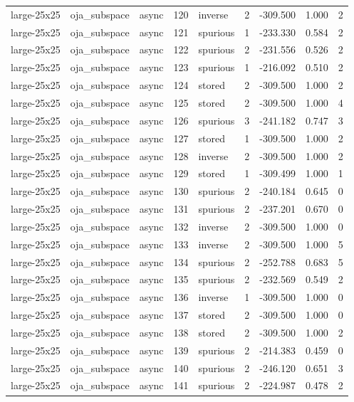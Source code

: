 \begin{tabular}{lllrlrrrr}
large-25x25 & oja\_subspace & async & 120 & inverse & 2 & -309.500 & 1.000 & 2 \\
large-25x25 & oja\_subspace & async & 121 & spurious & 1 & -233.330 & 0.584 & 2 \\
large-25x25 & oja\_subspace & async & 122 & spurious & 2 & -231.556 & 0.526 & 2 \\
large-25x25 & oja\_subspace & async & 123 & spurious & 1 & -216.092 & 0.510 & 2 \\
large-25x25 & oja\_subspace & async & 124 & stored & 2 & -309.500 & 1.000 & 2 \\
large-25x25 & oja\_subspace & async & 125 & stored & 2 & -309.500 & 1.000 & 4 \\
large-25x25 & oja\_subspace & async & 126 & spurious & 3 & -241.182 & 0.747 & 3 \\
large-25x25 & oja\_subspace & async & 127 & stored & 1 & -309.500 & 1.000 & 2 \\
large-25x25 & oja\_subspace & async & 128 & inverse & 2 & -309.500 & 1.000 & 2 \\
large-25x25 & oja\_subspace & async & 129 & stored & 1 & -309.499 & 1.000 & 1 \\
large-25x25 & oja\_subspace & async & 130 & spurious & 2 & -240.184 & 0.645 & 0 \\
large-25x25 & oja\_subspace & async & 131 & spurious & 2 & -237.201 & 0.670 & 0 \\
large-25x25 & oja\_subspace & async & 132 & inverse & 2 & -309.500 & 1.000 & 0 \\
large-25x25 & oja\_subspace & async & 133 & inverse & 2 & -309.500 & 1.000 & 5 \\
large-25x25 & oja\_subspace & async & 134 & spurious & 2 & -252.788 & 0.683 & 5 \\
large-25x25 & oja\_subspace & async & 135 & spurious & 2 & -232.569 & 0.549 & 2 \\
large-25x25 & oja\_subspace & async & 136 & inverse & 1 & -309.500 & 1.000 & 0 \\
large-25x25 & oja\_subspace & async & 137 & stored & 2 & -309.500 & 1.000 & 0 \\
large-25x25 & oja\_subspace & async & 138 & stored & 2 & -309.500 & 1.000 & 2 \\
large-25x25 & oja\_subspace & async & 139 & spurious & 2 & -214.383 & 0.459 & 0 \\
large-25x25 & oja\_subspace & async & 140 & spurious & 2 & -246.120 & 0.651 & 3 \\
large-25x25 & oja\_subspace & async & 141 & spurious & 2 & -224.987 & 0.478 & 2 \\

\end{tabular}
